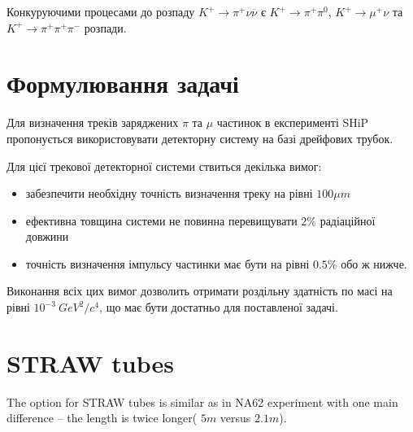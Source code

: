 \documentclass[]{article}
\begin{document}
		Конкуруючими процесами до розпаду 
		$ K^+ \rightarrow \pi^+\nu \overline{\nu} $ є 
		$ K^+ \rightarrow \pi^+\pi^0 $, 
		$ K^+ \rightarrow \mu^+ \nu $ та 
		$ K^+ \rightarrow \pi^+ \pi^+ \pi^- $ розпади.
		
		
		\section{Формулювання задачі}
		Для визначення треків заряджених $\pi$ та $\mu$ частинок в експерименті SHiP пропонується використовувати детекторну систему на базі дрейфових трубок.
		
		Для цієї трекової детекторної системи ствиться декілька вимог:
		\begin{itemize}
		\item забезпечити необхідну точність визначення треку на рівні $100 \mu m$
		\item ефективна товщина системи не повинна перевищувати $2\%$ радіаційної довжини
		\item точність визначення імпульсу частинки має бути на рівні $0.5\%$ обо ж нижче.
\end{itemize}
		Виконання всіх цих вимог дозволить отримати роздільну здатність по масі на рівні $10^{-3}~GeV^2 / c^4$, що має бути достатньо для поставленої задачі.

		
		
		
		 
		 
 \section{STRAW tubes}
	The option for STRAW tubes is similar as in NA62 experiment with one main difference -- the length is twice longer( $5m$ versus $2.1m$).
		
\end{document}
